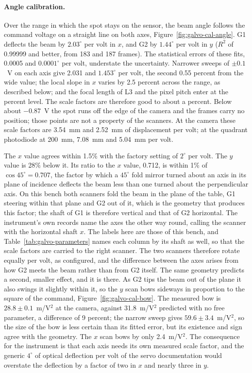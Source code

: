 \documentclass{article}
\begin{document}
\paragraph{Angle calibration.}
Over the range in which the spot stays on the sensor, the beam angle follows the command voltage on
a straight line on both axes, Figure~\ref{fig:galvo-cal-angle}. G1 deflects the beam by
$2.03^\circ$ per volt in $x$, and G2 by $1.44^\circ$ per volt in $y$ ($R^2$ of 0.99999 and
better, from 183 and 187 frames). The statistical errors of these fits, 0.0005 and
$0.0001^\circ$ per volt, understate the uncertainty. Narrower
sweeps of $\pm0.1$~V on each axis give 2.031 and $1.453^\circ$ per volt, the second 0.55 percent
from the wide value; the local slope in $x$ varies by 2.5 percent across the range, as described
below; and the focal length of L3 and the pixel pitch enter at the percent level. The scale
factors are therefore good to about a percent. Below about $-0.87$~V the
spot runs off the edge of the camera and the frames carry no position; those points are not a
property of the scanners. At the camera these scale factors are 3.54~mm and 2.52~mm of displacement
per volt; at the quadrant photodiode at 200~mm, 7.08~mm and 5.04~mm per volt.

The $x$ value agrees within 1.5\% with the factory setting of $2^\circ$ per volt. The $y$ value is
28\% below it. Its ratio to the $x$ value, 0.712, is within 1\% of $\cos 45^\circ = 0.707$, the factor
by which a $45^\circ$ fold mirror turned about an axis in its plane of incidence deflects the beam
less than one turned about the perpendicular axis. On this bench both scanners fold the beam in the
plane of the table, G1 steering within that plane and G2 out of it, which is the geometry that
produces this factor; the shaft of G1 is therefore vertical and that of G2 horizontal. The
instrument's own records name the axes the other way round, calling the scanner with the
horizontal shaft $x$. The labels here are those of this bench, and
Table~\ref{tab:galvo-parameters} names each column by its shaft as well, so that the scale factors
are carried to the right scanner. The two scanners therefore rotate equally per volt, as configured, and the
difference between the axes arises from how G2 meets the beam rather than from G2 itself. The same
geometry predicts a second, smaller effect, and it is there. As G2 tips the beam out of the plane it
also swings it slightly within it, so the $y$ scan bows sideways in proportion to the square of the
command, Figure~\ref{fig:galvo-cal-bow}. The measured bow is $28.8 \pm 0.1$~\textmu m/V$^2$ at the
camera, against 31.8~\textmu m/V$^2$ predicted with no free parameter, a difference of
9 percent; the narrow sweep gives $59.6 \pm 3.4$~\textmu m/V$^2$, so the size of the bow is less
certain than its fitted error, but its existence and sign agree with the geometry. The $x$ scan
bows by only 2.4~\textmu m/V$^2$. The consequence for the instrument is that each axis needs its own measured
scale factor, and the generic $4^\circ$ of optical deflection per volt of the servo documentation
would overstate the
deflection by a factor of two in $x$ and nearly three in $y$.
\end{document}
